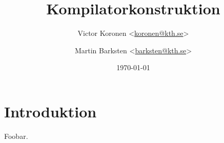 \documentclass[a4paper]{article}
\title{Kompilatorkonstruktion}
\author{%
    Victor Koronen <\href{mailto:koronen@kth.se}{koronen@kth.se}> \and
    Martin Barksten <\href{mailto:barksten@kth.se}{barksten@kth.se}>
}
\date{\today}
\begin{document}
\maketitle
\thispagestyle{empty}

\section{Introduktion}

Foobar.
\end{document}
